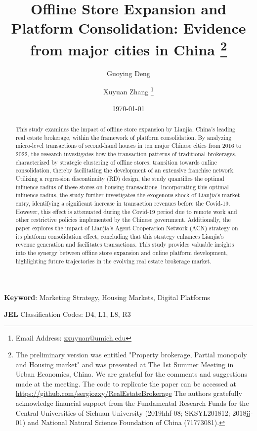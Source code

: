 \documentclass[12pt]{article}
\title{ \vspace*{-2.5cm} \hspace*{-0.5cm}Offline Store Expansion and Platform Consolidation: Evidence from major cities in China \footnote{
The preliminary version was entitled "Property brokerage, Partial monopoly and Housing market" and was presented at The 1st Summer Meeting in Urban Economics, China. We are grateful for the comments and suggestions made at the meeting. The code to replicate the paper can be accessed at \href{https://github.com/sergiozxy/RealEstateBrokerage}{https://github.com/sergiozxy/RealEstateBrokerage} The authors gratefully acknowledge financial support from the Fundamental Research Funds for the Central Universities of Sichuan University (2019hhf-08; SKSYL201812; 2018jj-01) and National Natural Science Foundation of China (71773081). %
}}
\date{ \vspace*{0.5cm} \today}
\begin{document}
\author[1]{Guoying Deng}
\author[2]{Xuyuan Zhang \thanks{Email Address: \href{mailto:zxuyuan@umich.edu}{zxuyuan@umich.edu}}}

\bgroup
\let\footnoterule\relax

\begin{singlespace}
\maketitle

\begin{abstract}
    \noindent This study examines the impact of offline store expansion by Lianjia, China's leading real estate brokerage, within the framework of platform consolidation. By analyzing micro-level transactions of second-hand houses in ten major Chinese cities from 2016 to 2022, the research investigates how the transaction patterns of traditional brokerages, characterized by strategic clustering of offline stores, transition towards online consolidation, thereby facilitating the development of an extensive franchise network. Utilizing a regression discontinuity (RD) design, the study quantifies the optimal influence radius of these stores on housing transactions. Incorporating this optimal influence radius, the study further investigates the exogenous shock of Lianjia's market entry, identifying a significant increase in transaction revenues before the Covid-19. However, this effect is attenuated during the Covid-19 period due to remote work and other restrictive policies implemented by the Chinese government. Additionally, the paper explores the impact of Lianjia's Agent Cooperation Network (ACN) strategy on its platform consolidation effect, concluding that this strategy enhances Lianjia's revenue generation and facilitates transactions. This study provides valuable insights into the synergy between offline store expansion and online platform development, highlighting future trajectories in the evolving real estate brokerage market.
  \end{abstract}
  
  \textbf{Keyword}: Marketing Strategy, Housing Markets, Digital Platforms
  
  \textbf{JEL} Classification Codes: D4, L1, L8, R3
\end{singlespace}
\thispagestyle{empty}
\end{document}
